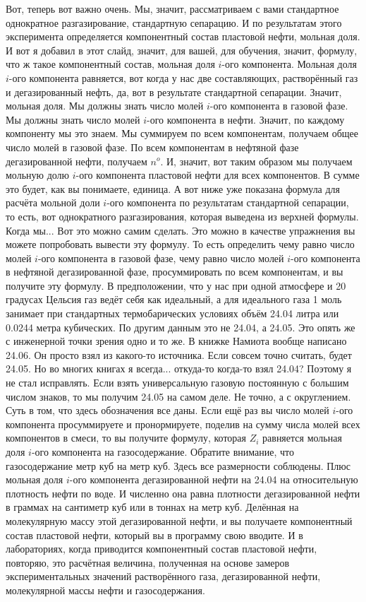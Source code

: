\documentclass[main.tex]{subfiles}
\begin{document}
Вот, теперь вот важно очень.
Мы, значит, рассматриваем с вами стандартное однократное разгазирование, стандартную сепарацию.
И по результатам этого эксперимента определяется компонентный состав пластовой нефти, мольная доля.
И вот я добавил в этот слайд, значит, для вашей, для обучения, значит, формулу, что ж такое компонентный состав, мольная доля $i$-ого компонента.
Мольная доля $i$-ого компонента равняется, вот когда у нас две составляющих, растворённый газ и дегазированный нефть, да, вот в результате стандартной сепарации.
Значит, мольная доля.
Мы должны знать число молей $i$-ого компонента в газовой фазе.
Мы должны знать число молей $i$-ого компонента в нефти.
Значит, по каждому компоненту мы это знаем.
Мы суммируем по всем компонентам, получаем общее число молей в газовой фазе.
По всем компонентам в нефтяной фазе дегазированной нефти,
получаем $n^o$.
И, значит, вот таким образом мы получаем мольную долю $i$-ого компонента пластовой нефти для всех компонентов.
В сумме это будет, как вы понимаете, единица.
А вот ниже уже показана формула для расчёта мольной доли $i$-ого компонента по результатам стандартной сепарации, то есть, вот однократного разгазирования, которая выведена из верхней формулы.
Когда мы...
Вот это можно самим сделать.
Это можно в качестве упражнения вы можете попробовать вывести эту формулу.
То есть определить чему равно число молей $i$-ого компонента в газовой фазе, чему равно число молей $i$-ого компонента в нефтяной дегазированной фазе, просуммировать по всем компонентам, и вы получите эту формулу.
В предположении, что у нас при одной атмосфере и 20 градусах Цельсия газ ведёт себя как идеальный, а для идеального газа 1 моль занимает при стандартных термобарических условиях объём 24.04 литра или 0.0244 метра кубических.
По другим данным это не 24.04, а 24.05.
Это опять же с инженерной точки зрения одно и то же.
В книжке Намиота вообще написано 24.06.
Он просто взял из какого-то источника.
Если совсем точно считать, будет 24.05.
Но во многих книгах я всегда... откуда-то когда-то взял 24.04?
Поэтому я не стал исправлять.
Если взять универсальную газовую постоянную с большим числом знаков, то мы получим 24.05 на самом деле.
Не точно, а с округлением.
Суть в том, что здесь обозначения все даны.
Если ещё раз вы число молей $i$-ого компонента просуммируете и пронормируете, поделив на сумму числа молей всех компонентов в смеси, то вы получите формулу, которая $Z_i$ равняется мольная доля $i$-ого компонента на газосодержание.
Обратите внимание, что газосодержание метр куб на метр куб.
Здесь все размерности соблюдены.
Плюс мольная доля $i$-ого компонента дегазированной нефти на 24.04 на относительную плотность нефти по воде.
И численно она равна плотности дегазированной нефти в граммах на сантиметр куб или в тоннах на метр куб.
Делённая на молекулярную массу этой дегазированной нефти, и вы получаете компонентный состав пластовой нефти, который вы в программу свою вводите.
И в лабораториях, когда приводится компонентный состав пластовой нефти, повторяю, это расчётная величина, полученная на основе замеров экспериментальных значений растворённого газа, дегазированной нефти, молекулярной массы нефти и газосодержания.
\end{document}
